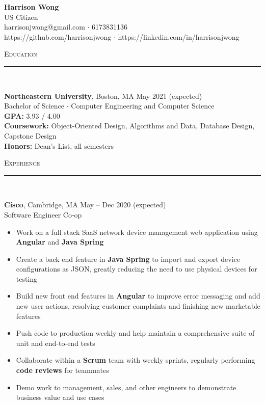 \documentclass[11pt]{article}
\begin{document}
\small
\center
	\textbf{\huge Harrison Wong}  \\
	\vspace{0.05in}
	US Citizen \\
	harrisonjwong@gmail.com $\cdot$ 6173831136 \\
	https://github.com/harrisonjwong $\cdot$ https://linkedin.com/in/harrisonjwong \\
	\vspace{0.1in}
	
\begin{raggedright}

	\textsc{\Large Education} \\
	\vspace{-0.1in}
	\rule{\textwidth}{0.4pt} \\
	\vspace{0.05in}

	\textbf{\large Northeastern University}, Boston, MA 
	\hfill May 2021 (expected) \\
	Bachelor of Science $\cdot$ Computer Engineering and Computer Science \\
	\textbf{GPA:} \hspace{33pt} 3.93 / 4.00 \\
	\textbf{Coursework:} Object-Oriented Design, Algorithms and Data, Database Design, Capstone Design \\
	\textbf{Honors:} \hspace {19pt} Dean's List, all semesters
	\vspace{0.1in}
	
	\textsc{\Large Experience} \\
	\vspace{-0.1in}
	\rule{\textwidth}{0.4pt} \\
	\vspace{0.05in}
	
	\textbf{\large Cisco}, Cambridge, MA \hfill May -- Dec 2020 (expected) \\
	Software Engineer Co-op \\

		\begin{itemize}
		\item Work on a full stack SaaS network device management web application using \textbf{Angular} and \textbf{Java Spring}
		\item Create a back end feature in \textbf{Java Spring} to import and export device configurations as JSON, greatly
reducing the need to use physical devices for testing
		\item Build new front end features in \textbf{Angular} to improve error messaging and add new user actions, resolving customer complaints and finishing new marketable features
		\item Push code to production weekly and help maintain a comprehensive suite of unit and end-to-end tests
		\item Collaborate within a \textbf{Scrum} team with weekly sprints, regularly performing \textbf{code reviews} for teammates
		\item Demo work to management, sales, and other engineers to demonstrate business value and use cases
		\end{itemize}
	\vspace{0.1in}


\end{raggedright}
\end{document}
